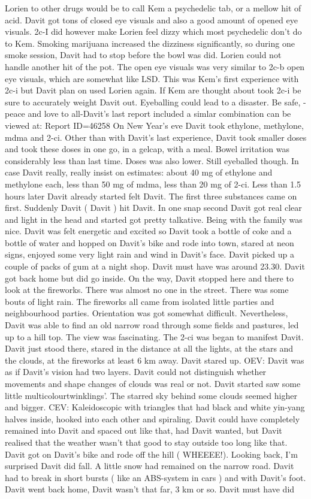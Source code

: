 \documentclass[12pt]{book}
\begin{document}
Lorien to other drugs would be to call Kem a psychedelic tab, or a mellow hit of acid. Davit got tons of closed eye visuals and also a good amount of opened eye visuals. 2c-I did however make Lorien feel dizzy which most psychedelic don't do to Kem. Smoking marijuana increased the dizziness significantly, so during one smoke session, Davit had to stop before the bowl was did. Lorien could not handle another hit of the pot. The open eye visuals was very similar to 2c-b open eye visuals, which are somewhat like LSD. This was Kem's first experience with 2c-i but Davit plan on used Lorien again. If Kem are thought about took 2c-i be sure to accurately weight Davit out. Eyeballing could lead to a disaster. Be safe, -peace and love to all-Davit's last report included a simlar combination can be viewed at: Report ID=46258 On New Year's eve Davit took ethylone, methylone, mdma and 2-ci. Other than with Davit's last experience, Davit took smaller doses and took these doses in one go, in a gelcap, with a meal. Bowel irritation was considerably less than last time. Doses was also lower. Still eyeballed though. In case Davit really, really insist on estimates: about 40 mg of ethylone and methylone each, less than 50 mg of mdma, less than 20 mg of 2-ci. Less than 1.5 hours later Davit already started felt Davit. The first three substances came on first. Suddenly Davit ( Davit ) hit Davit. In one snap second Davit got real clear and light in the head and started got pretty talkative. Being with the family was nice. Davit was felt energetic and excited so Davit took a bottle of coke and a bottle of water and hopped on Davit's bike and rode into town, stared at neon signs, enjoyed some very light rain and wind in Davit's face. Davit picked up a couple of packs of gum at a night shop. Davit must have was around 23.30. Davit got back home but did go inside. On the way, Davit stopped here and there to look at the fireworks. There was almost no one in the street. There was some bouts of light rain. The fireworks all came from isolated little parties and neighbourhood parties. Orientation was got somewhat difficult. Nevertheless, Davit was able to find an old narrow road through some fields and pastures, led up to a hill top. The view was fascinating. The 2-ci was began to manifest Davit. Davit just stood there, stared in the distance at all the lights, at the stars and the clouds, at the fireworks at least 6 km away. Davit stared up. OEV: Davit was as if Davit's vision had two layers. Davit could not distinguish whether movements and shape changes of clouds was real or not. Davit started saw some little multicolourtwinklings'. The starred sky behind some clouds seemed higher and bigger. CEV: Kaleidoscopic with triangles that had black and white yin-yang halves inside, hooked into each other and spiraling. Davit could have completely remained into Davit and spaced out like that, had Davit wanted, but Davit realised that the weather wasn't that good to stay outside too long like that. Davit got on Davit's bike and rode off the hill ( WHEEEE!). Looking back, I'm surprised Davit did fall. A little snow had remained on the narrow road. Davit had to break in short bursts ( like an ABS-system in cars ) and with Davit's foot. Davit went back home, Davit wasn't that far, 3 km or so. Davit must have did 
\end{document}
